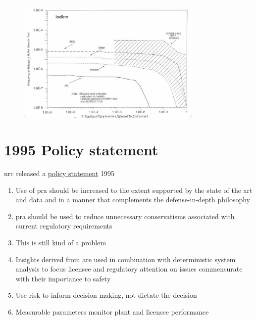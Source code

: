 \documentclass[aspectratio=1610,pdftex,dvipsnames,compress,xcolor={dvipsnames}]{beamer}
\newcommand{\acs}{\acrshort} %
\newcommand{\acsp}{\acrshortpl} %
\begin{document}
\begin{frame}{}
    \begin{figure}
        \centering
        \includegraphics[width=0.80\textwidth]{iodine.release.jpg}
    \end{figure}
\end{frame}


\section{1995 Policy statement}


\addtocounter{framenumber}{-1}
\begin{frame}{\acs{nrc} released a \href{https://www.nrc.gov/about-nrc/regulatory/risk-informed/history.html}{policy statement} 1995}
    \begin{enumerate}[series=outerlist,topsep=0pt,itemsep=17pt,leftmargin=*,label=(\arabic*)]
        \item[]Use of \acs{pra} should be increased to the extent supported by the state of the art and data and in a manner that complements the defense-in-depth philosophy
        \item[]\acs{pra} should be used to reduce unnecessary conservatisms associated with current regulatory requirements
        \item[]This is still kind of a problem
        \item[]Insights derived from \acsp{pra} are used in combination with deterministic system analysis to focus licensee and regulatory attention on issues commensurate with their importance to safety
        \item[]Use risk to inform decision making, not dictate the decision
        \item[]Measurable parameters monitor plant and licensee performance
    \end{enumerate}
\end{frame}
\end{document}
